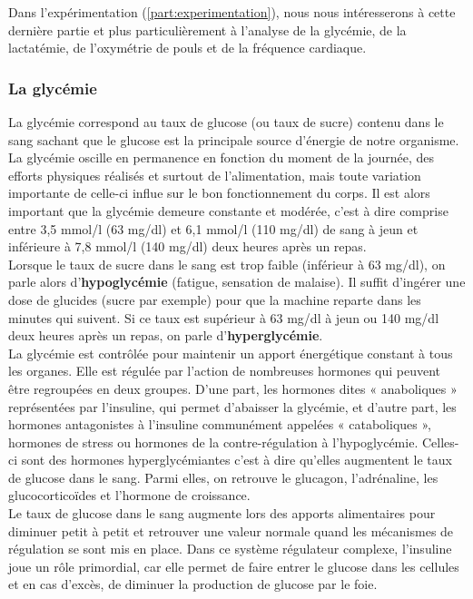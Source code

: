         Dans l'expérimentation (\autoref{part:experimentation}), nous nous intéresserons à cette dernière partie et plus particulièrement à l'analyse de la glycémie, de la lactatémie, de l'oxymétrie de pouls et de la fréquence cardiaque.\\
    
    
        \subsubsection{La glycémie}
        \label{glycemie}
        
        La glycémie correspond au taux de glucose (ou taux de sucre) contenu dans le sang sachant que le glucose est la principale source d'énergie de notre organisme. La glycémie oscille en permanence en fonction du moment de la journée, des efforts physiques réalisés et surtout de l'alimentation, mais toute variation importante de celle-ci influe sur le bon fonctionnement du corps. Il est alors important que la glycémie demeure constante et modérée, c'est à dire comprise entre 3,5 mmol/l (63 mg/dl) et 6,1 mmol/l (110 mg/dl) de sang à jeun et inférieure à 7,8 mmol/l (140 mg/dl) deux heures après un repas. \\

        Lorsque le taux de sucre dans le sang est trop faible (inférieur à  63 mg/dl), on parle alors d'\textbf{hypoglycémie} (fatigue, sensation de malaise). Il suffit d'ingérer une dose de glucides (sucre par exemple) pour que la machine reparte dans les minutes qui suivent. Si ce taux est supérieur à 63 mg/dl à jeun ou 140 mg/dl deux heures après un repas, on parle d'\textbf{hyperglycémie}. \\
        
        La glycémie est contrôlée pour maintenir un apport énergétique constant à tous les organes. Elle est régulée par l’action de nombreuses hormones qui peuvent être regroupées en deux groupes. D'une part, les hormones dites « anaboliques »  représentées par l’insuline, qui permet d'abaisser la glycémie, et d’autre part, les hormones antagonistes à l'insuline communément appelées « cataboliques », hormones de stress ou hormones de la contre-régulation à l’hypoglycémie. Celles-ci sont des hormones hyperglycémiantes c'est à dire qu'elles augmentent le taux de glucose dans le sang. Parmi elles, on retrouve le glucagon, l’adrénaline, les glucocorticoïdes et l’hormone de croissance.    \\

        Le taux de glucose dans le sang augmente lors des apports alimentaires pour diminuer petit à petit et retrouver une valeur normale quand les mécanismes de régulation se sont mis en place. Dans ce système régulateur complexe, l'insuline joue un rôle primordial, car elle permet de faire entrer le glucose dans les cellules et en cas d'excès, de diminuer la production de glucose par le foie. \\

